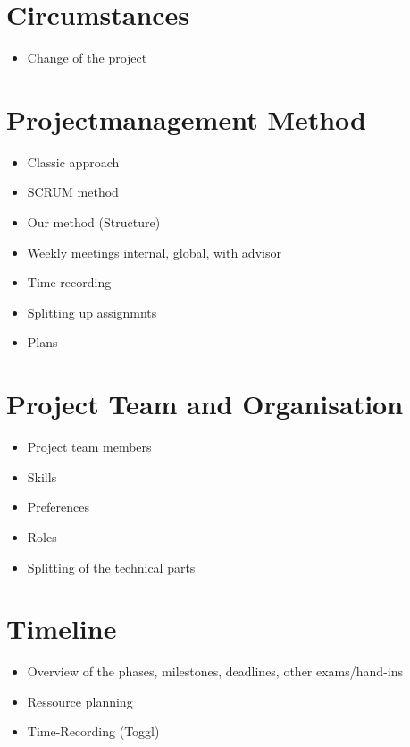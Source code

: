 \section{Circumstances}

	\begin{itemize}
		\item Change of the project
	\end{itemize}



\section{Projectmanagement Method}

	\begin{itemize}
		\item Classic approach
		\item SCRUM method
		\item Our method (Structure)
			\item Weekly meetings internal, global, with advisor
			\item Time recording
			\item Splitting up assignmnts
			\item Plans
	\end{itemize}



\section{Project Team and Organisation}

	\begin{itemize}
		\item Project team members
		\item Skills
		\item Preferences
		\item Roles
		\item Splitting of the technical parts
	\end{itemize}



\section{Timeline}

	\begin{itemize}
		\item Overview of the phases, milestones, deadlines, other exams/hand-ins
		\item Ressource planning
		\item Time-Recording (Toggl)
	\end{itemize}



